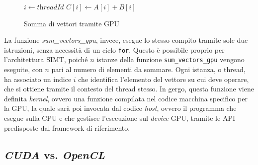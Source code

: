 \begin{figure}[h!]
  \vspace{1em}
  \begin{algorithm}
    [H]
    \caption{Somma di vettori tramite GPU}
    \label{alg:sumvectorsgpu}
    \begin{algorithmic}
       \State $i \gets \textit{threadId}$ \State
      $C[i] \gets A[i] + B[i]$ \EndFunction
    \end{algorithmic}
  \end{algorithm}
  \vspace{1em}
\end{figure}

La funzione \textit{sum\_vectors\_gpu}, invece, esegue lo stesso compito tramite
sole due istruzioni, senza necessità di un ciclo \texttt{for}. Questo è possibile
proprio per l'architettura SIMT, poiché $n$ istanze della funzione \texttt{sum\_vectors\_gpu}
vengono eseguite, con $n$ pari al numero di elementi da sommare. Ogni istanza, o
thread, ha associato un indice $i$ che identifica l'elemento del vettore su cui deve
operare, che si ottiene tramite il contesto del thread stesso. In gergo, questa
funzione viene definita \textit{kernel}, ovvero una funzione compilata nel
codice macchina specifico per la GPU, la quale sarà poi invocata dal codice \textit{host},
ovvero il programma che esegue sulla CPU e che gestisce l'esecuzione sul \textit{device}
GPU, tramite le API predisposte dal framework di riferimento.

\subsection[\textit{CUDA} vs. \textit{OpenCL}]{\textit{CUDA} vs. \textit{OpenCL}\cite{cuda}\cite{opencl}\cite{cudavsopencl}}
\label{subsec:cudavsopencl}

